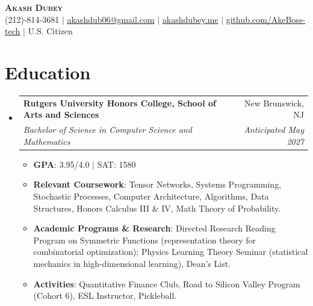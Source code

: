 \documentclass[letterpaper,11pt]{article}
\makeatletter
\newcommand{\resumeItem}[1]{
  \item\small{
    {#1 \vspace{-2pt}}
  }
}
\newcommand{\resumeSubheading}[4]{
  \vspace{-2pt}\item
    \begin{tabular*}{0.97\textwidth}[t]{l@{\extracolsep{\fill}}r}
      \textbf{#1} & #2 \\
      \textit{\small#3} & \textit{\small #4} \\
    \end{tabular*}\vspace{-7pt}
}
\newcommand{\resumeSubHeadingListStart}{\begin{itemize}[leftmargin=0.15in, label={}]}
\newcommand{\resumeSubHeadingListEnd}{\end{itemize}}
\newcommand{\resumeItemListStart}{\begin{itemize}}
\newcommand{\resumeItemListEnd}{\end{itemize}\vspace{-5pt}}
\makeatother
\begin{document}
\begin{center}
    \textbf{\Huge \scshape Akash Dubey} \\ \vspace{1pt}
    \small (212)-814-3681 $|$ \href{mailto:akashdub06@gmail.com}{\underline{akashdub06@gmail.com}} $|$
    \href{https://akashdubey.me/}{\underline{akashdubey.me}} $|$
    \href{https://github.com/AkeBoss-tech}{\underline{github.com/AkeBoss-tech}} $|$
    \small U.S. Citizen
\end{center}
\section{Education}
  \resumeSubHeadingListStart
    \resumeSubheading
      {Rutgers University Honors College, School of Arts and Sciences}{New Brunswick, NJ}
      {Bachelor of Science in Computer Science and Mathematics}{Anticipated May 2027}
      \resumeItemListStart
        \resumeItem{\textbf{GPA}: 3.95/4.0 $|$ SAT: 1580}
        \resumeItem{\textbf{Relevant Coursework}: Tensor Networks, Systems Programming, Stochastic Processes, Computer Architecture, Algorithms, Data Structures, Honors Calculus III \& IV, Math Theory of Probability.}
        \resumeItem{\textbf{Academic Programs \& Research}: Directed Research Reading Program on Symmetric Functions (representation theory for combinatorial optimization); Physics Learning Theory Seminar (statistical mechanics in high-dimensional learning), Dean's List.}
        \resumeItem{\textbf{Activities}: Quantitative Finance Club, Road to Silicon Valley Program (Cohort 6), ESL Instructor, Pickleball.}
      \resumeItemListEnd
  \resumeSubHeadingListEnd
\end{document}
